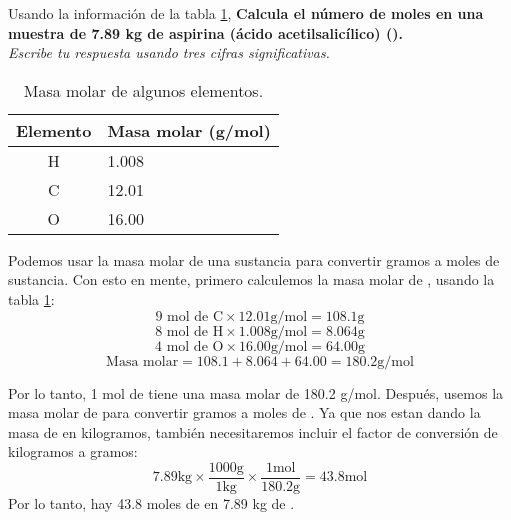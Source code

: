 \begin{multicols}{2}
    Usando la información de la tabla \ref{tab:q002},
    \textbf{Calcula el número de moles en una muestra de 7.89 kg de aspirina (ácido acetilsalicílico) ().}\\
    \emph{Escribe tu respuesta usando tres cifras significativas.}

    \begin{table}[H]
        \centering
        \caption{Masa molar de algunos elementos.}
        \label{tab:q002}
        \begin{tabular}{c|p{2.2cm}}
            \textbf{Elemento} & \textbf{Masa molar (g/mol)} \\\midrule
            H                 & 1.008                       \\\hline
            C                 & 12.01                       \\\hline
            O                 & 16.00                       \\\hline
            \bottomrule
        \end{tabular}
    \end{table}

\end{multicols}

\begin{solutionbox}{8cm}
    Podemos usar la masa molar de una sustancia para convertir gramos a moles de sustancia. Con esto en mente, primero calculemos la masa molar de , usando la tabla \ref{tab:q002}:
    \[9 \text{ mol de C} \times 12.01 \text{g/mol} = 108.1 \text{g}\]
    \[8 \text{ mol de H} \times 1.008 \text{g/mol} = 8.064 \text{g}\]
    \[4 \text{ mol de O} \times 16.00 \text{g/mol} = 64.00 \text{g}\]
    \[\text{Masa molar} = 108.1 + 8.064 + 64.00 = 180.2 \text{g/mol}\]

    Por lo tanto, 1 mol de  tiene una masa molar de 180.2 g/mol.
    Después, usemos la masa molar de  para convertir gramos a moles de .
    Ya que nos estan dando la masa de  en kilogramos, también necesitaremos incluir el factor de conversión de kilogramos a gramos:
    \[7.89 \text{kg} \times \frac{1000 \text{g}}{1 \text{kg}} \times \frac{1 \text{mol}}{180.2 \text{g}} = 43.8 \text{mol}\]
    Por lo tanto, hay 43.8 moles de  en 7.89 kg de .
\end{solutionbox}